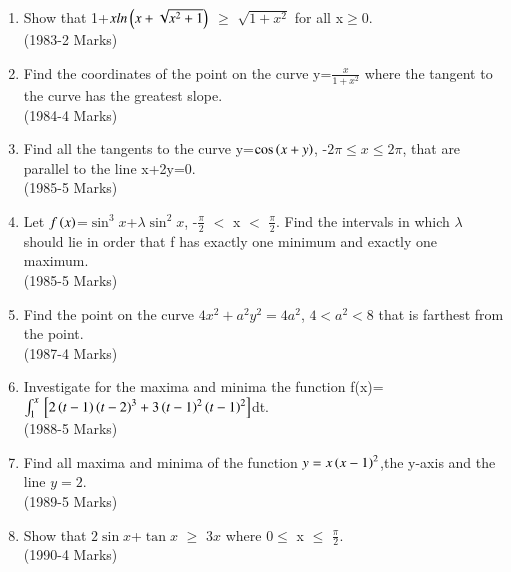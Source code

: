 \documentclass[journal,12pt,twocolumn]{IEEEtran}
\theoremstyle{remark}
\begin{document}
\begin{enumerate}
\hfill{(1982-2 Marks)}

\item Show that 1+$x ln\left(x+\sqrt{x^2+1}\right)$ $\geq$ $\sqrt{1+x^2}$ for all x$\geq$0.\\

\hfill{(1983-2 Marks)}

\item Find the coordinates of the point on the curve y=$\frac{x}{1+x^2}$ where the tangent to the curve has the greatest slope.\\

\hfill{(1984-4 Marks)}

\item  Find all the tangents to the curve y=$\cos\left(x+y\right)$, -$2\pi\leq x \leq2\pi$, that are parallel to the line x+2y=0.\\

\hfill{(1985-5 Marks)}

\item  Let $f\left(x\right)$=$\sin^3x$+$\lambda\sin^2x$,  -$\frac{\pi}{2}$ $<$  x $<$ $\frac{\pi}{2}$. Find the intervals in which $\lambda $ should lie in order that f has exactly one minimum  and exactly one maximum.\\

\hfill{(1985-5 Marks)}

\item  Find the point on the curve $4x^2+a^2y^2=4a^2$, $4<a^2<8$  that is farthest from the point.\\

\hfill{(1987-4 Marks)}

\item  Investigate for the maxima and minima the function 
f(x)=$\int_{1}^{x}{}\left[2\left(t-1\right)\left(t-2\right)^3+3\left(t-1\right)^2\left(t-1\right)^2\right]$dt.\\

\hfill{(1988-5 Marks)}

\item  Find all maxima and minima of the function $y=x\left(x-1\right)^2$,the y-axis and the line $y=2$.\\

\hfill{(1989-5 Marks)}

\item Show that $2\sin x$+$\tan x$ $\ge$ $3x$   where $0\le$ x $\le$ $\frac{\pi}{2}$.\\

\hfill{(1990-4 Marks)}

\end{enumerate}
\end{document}
